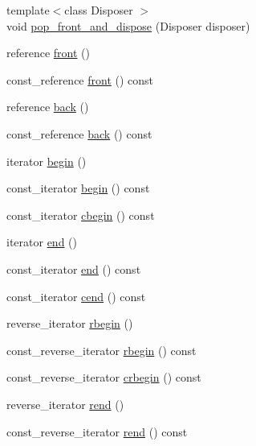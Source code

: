 \begin{DoxyCompactItemize}
{\footnotesize template$<$class Disposer $>$ }\\void \hyperlink{classboost_1_1intrusive_1_1list__impl_ab1d06a67a6e0f958b0f3afd61d2af8d5}{pop\+\_\+front\+\_\+and\+\_\+dispose} (Disposer disposer)
\item 
reference \hyperlink{classboost_1_1intrusive_1_1list__impl_adfff2fc56d86000cced59427fecf0e90}{front} ()
\item 
const\+\_\+reference \hyperlink{classboost_1_1intrusive_1_1list__impl_a51eb323fe6d3cc6c590886a7514dbb27}{front} () const
\item 
reference \hyperlink{classboost_1_1intrusive_1_1list__impl_a257758f8527be08329dbc14ca5527fd8}{back} ()
\item 
const\+\_\+reference \hyperlink{classboost_1_1intrusive_1_1list__impl_a92fa54fafbdf353a6b51c145c775d215}{back} () const
\item 
iterator \hyperlink{classboost_1_1intrusive_1_1list__impl_acc6da960285b2ff0f37e1f373a767e19}{begin} ()
\item 
const\+\_\+iterator \hyperlink{classboost_1_1intrusive_1_1list__impl_a049277a05485ff97f95ff4d778c5551d}{begin} () const
\item 
const\+\_\+iterator \hyperlink{classboost_1_1intrusive_1_1list__impl_adc17ab4f4ca5c3817adf62960dec3d40}{cbegin} () const
\item 
iterator \hyperlink{classboost_1_1intrusive_1_1list__impl_af2a454471fced6d4b2fb899c50bbee67}{end} ()
\item 
const\+\_\+iterator \hyperlink{classboost_1_1intrusive_1_1list__impl_a797bd19e3f14f42d556bb85de2fc1ac3}{end} () const
\item 
const\+\_\+iterator \hyperlink{classboost_1_1intrusive_1_1list__impl_ab683bf5010edc6008b3c6e0adbc33b70}{cend} () const
\item 
reverse\+\_\+iterator \hyperlink{classboost_1_1intrusive_1_1list__impl_a0073263f314407b1e94f63084e05b77e}{rbegin} ()
\item 
const\+\_\+reverse\+\_\+iterator \hyperlink{classboost_1_1intrusive_1_1list__impl_a7a6e55dedd23bd303a71d764395420a8}{rbegin} () const
\item 
const\+\_\+reverse\+\_\+iterator \hyperlink{classboost_1_1intrusive_1_1list__impl_aaec6d64d661acea3e7b92be73332618a}{crbegin} () const
\item 
reverse\+\_\+iterator \hyperlink{classboost_1_1intrusive_1_1list__impl_a4e8cb800394865d8a46cf83510b2dfbd}{rend} ()
\item 
const\+\_\+reverse\+\_\+iterator \hyperlink{classboost_1_1intrusive_1_1list__impl_a0be73e24a3891a9ca9391c9762e5cc72}{rend} () const

\end{DoxyCompactItemize}
